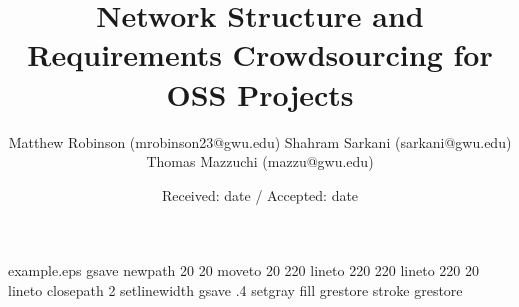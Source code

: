 %
%
%
%
\begin{filecontents*}{example.eps}
gsave
newpath
  20 20 moveto
  20 220 lineto
  220 220 lineto
  220 20 lineto
closepath
2 setlinewidth
gsave
  .4 setgray fill
grestore
stroke
grestore
\end{filecontents*}
%
\RequirePackage{fix-cm}
%
\documentclass{svjour3}                     %
%
\smartqed  %
\usepackage{graphicx}
\usepackage{cite}


\title{Network Structure and Requirements Crowdsourcing for OSS Projects}

\author{Matthew Robinson (mrobinson23@gwu.edu)
    Shahram Sarkani (sarkani@gwu.edu) 
    Thomas Mazzuchi (mazzu@gwu.edu)
}


\date{Received: date / Accepted: date}

\maketitle

